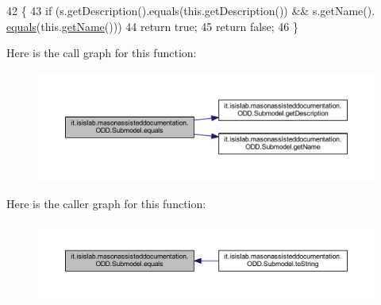 \begin{DoxyCode}
42                                      \{
43         \textcolor{keywordflow}{if} (s.getDescription().equals(this.getDescription()) && s.getName().
      \hyperlink{classit_1_1isislab_1_1masonassisteddocumentation_1_1_o_d_d_1_1_submodel_afef2a783ff6aaf811ced69506a527265}{equals}(this.\hyperlink{classit_1_1isislab_1_1masonassisteddocumentation_1_1_o_d_d_1_1_submodel_a52d60158adf71622ba8554abb72a12b9}{getName}()))
44             \textcolor{keywordflow}{return} \textcolor{keyword}{true};
45         \textcolor{keywordflow}{return} \textcolor{keyword}{false};
46     \}
\end{DoxyCode}


Here is the call graph for this function\-:\nopagebreak
\begin{figure}[H]
\begin{center}
\leavevmode
\includegraphics[width=350pt]{classit_1_1isislab_1_1masonassisteddocumentation_1_1_o_d_d_1_1_submodel_afef2a783ff6aaf811ced69506a527265_cgraph}
\end{center}
\end{figure}




Here is the caller graph for this function\-:\nopagebreak
\begin{figure}[H]
\begin{center}
\leavevmode
\includegraphics[width=350pt]{classit_1_1isislab_1_1masonassisteddocumentation_1_1_o_d_d_1_1_submodel_afef2a783ff6aaf811ced69506a527265_icgraph}
\end{center}
\end{figure}


